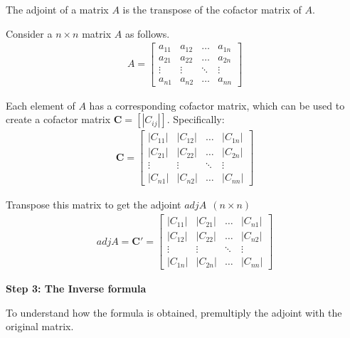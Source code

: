 \documentclass[10pt,a4paper]{book}
\theoremstyle{definition}\newtheorem{definition}{Definition}
\theoremstyle{definition}\newtheorem{fact}{Fact}
\theoremstyle{definition}\newtheorem{ex}{Ex.}
\theoremstyle{definition}\newtheorem{project}{Project}
\theoremstyle{definition}\newtheorem{problem}{Problem}
\theoremstyle{definition}\newtheorem{example}{Example}
\numberwithin{theorem}{chapter}
\numberwithin{corollary}{chapter}
\numberwithin{assumption}{chapter}
\numberwithin{definition}{chapter}
\numberwithin{prop}{chapter}
\numberwithin{notation}{chapter}
\numberwithin{problem}{chapter}
\numberwithin{example}{chapter}
\numberwithin{fact}{chapter}
\numberwithin{ex}{chapter}
\def\C{\mathbf C}
\begin{document}
	The adjoint of a matrix $A$ is the transpose of the cofactor matrix of $A$.
	
	Consider a $ n \times n $ matrix $A$ as follows.
	\begin{align*}
		A = \begin{bmatrix}
			a_{11} & a_{12} & \dots  & a_{1n} \\
			a_{21} & a_{22} & \dots  & a_{2n} \\
			\vdots & \vdots & \ddots & \vdots \\
			a_{n1} & a_{n2} & \dots  & a_{nn} 
		\end{bmatrix}
	\end{align*}
	
	Each element of $ A $ has a corresponding cofactor	 matrix, which can be used to create a cofactor matrix $\C = [ |C_{ij}| ] $. Specifically:
	\begin{align*}
		\C = \begin{bmatrix}
			|C_{11}| & |C_{12}| & \dots  & |C_{1n}| \\
			|C_{21}| & |C_{22}| & \dots  & |C_{2n}| \\
			\vdots   & \vdots   & \ddots & \vdots   \\
			|C_{n1}| & |C_{n2}| & \dots  & |C_{nn}| 
		\end{bmatrix}
	\end{align*}
	
	Transpose this matrix to get the adjoint $ adj A \ \ (n\times n)$
	\begin{align*}
		adj A = \C' = \begin{bmatrix}
			|C_{11}| & |C_{21}| & \dots  & |C_{n1}| \\
			|C_{12}| & |C_{22}| & \dots  & |C_{n2}| \\
			\vdots   & \vdots   & \ddots & \vdots   \\
			|C_{1n}| & |C_{2n}| & \dots  & |C_{nn}| 
		\end{bmatrix}
	\end{align*}
	
	\textbf{Step 3: The Inverse formula}
	
	To understand how the formula is obtained, premultiply the adjoint with the original matrix.
	
\end{document}
